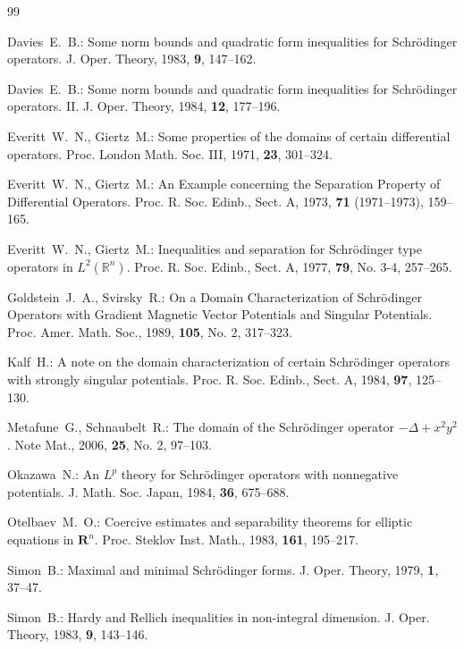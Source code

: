 \documentclass[11pt,reqno]{amsart}
\newcommand{\R}{{\mathbb R}}
\begin{document}
\begin{thebibliography}{99}

 Davies~E.~B.:
\newblock Some norm bounds and quadratic form inequalities for Schr\"odinger operators.
\newblock J. Oper. Theory, 1983, \textbf{9}, 147--162.

 Davies~E.~B.:
\newblock Some norm bounds and quadratic form inequalities for Schr\"odinger operators. II.
\newblock J. Oper. Theory, 1984, \textbf{12}, 177--196.

 Everitt~W.~N., Giertz~M.:
\newblock Some properties of the domains of certain differential operators.
\newblock Proc. London Math. Soc. III, 1971, \textbf{23}, 301--324.

 Everitt~W.~N., Giertz~M.:
\newblock An Example concerning the Separation Property of Differential Operators.
\newblock Proc. R. Soc. Edinb., Sect. A, 1973, \textbf{71} (1971--1973), 159--165.

 Everitt~W.~N., Giertz~M.:
\newblock Inequalities and separation for Schr\"odinger type operators in $L^2(\R^n)$.
\newblock Proc. R. Soc. Edinb., Sect. A, 1977, \textbf{79}, No. 3-4, 257--265.

 Goldstein~J.~A., Svirsky~R.:
\newblock On a Domain Characterization of Schr\"odinger Operators with Gradient Magnetic Vector Potentials and Singular Potentials.
\newblock Proc. Amer. Math. Soc., 1989, \textbf{105}, No. 2, 317--323.

 Kalf~H.:
\newblock A note on the domain characterization of certain Schr\"odinger operators with strongly singular potentials.
\newblock Proc. R. Soc. Edinb., Sect. A, 1984, \textbf{97}, 125--130.

 Metafune~G., Schnaubelt~R.:
\newblock The domain of the Schr\"odinger operator $-\Delta+x^2y^2$.
\newblock Note Mat., 2006, \textbf{25}, No. 2, 97--103.

 Okazawa~N.:
\newblock An $L^p$ theory for Schr\"odinger operators with nonnegative potentials.
\newblock J. Math. Soc. Japan, 1984, \textbf{36}, 675--688.

 Otelbaev~M.~O.:
\newblock Coercive estimates and separability theorems for elliptic equations in ${\mathbf R}^n$.
\newblock Proc. Steklov Inst. Math., 1983, \textbf{161}, 195--217.

 Simon~B.:
\newblock Maximal and minimal Schr\"odinger forms.
\newblock J. Oper. Theory, 1979, \textbf{1}, 37--47.

 Simon~B.:
\newblock Hardy and Rellich inequalities in non-integral dimension.
\newblock J. Oper. Theory, 1983, \textbf{9}, 143--146.

\end{thebibliography}
\end{document}

